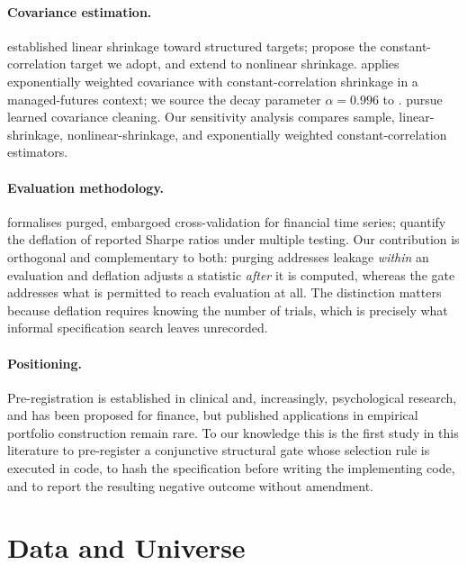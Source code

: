 \documentclass[12pt,letterpaper]{article}
\begin{document}
\paragraph{Covariance estimation.} \citet{ledoitwolf2004a} established linear
shrinkage toward structured targets; \citet{ledoitwolf2004b} propose the
constant-correlation target we adopt, and \citet{ledoitwolf2022} extend to nonlinear
shrinkage. \citet{molyboga2020} applies exponentially weighted covariance with
constant-correlation shrinkage in a managed-futures context; we source the decay
parameter $\alpha = 0.996$ to \citet{pafka2004}.
\citet{bongiorno2026} pursue learned covariance cleaning. Our sensitivity analysis
compares sample, linear-shrinkage, nonlinear-shrinkage, and exponentially weighted
constant-correlation estimators.

\paragraph{Evaluation methodology.} \citet{lopezdeprado2018} formalises purged,
embargoed cross-validation for financial time series; \citet{bailey2014} quantify the
deflation of reported Sharpe ratios under multiple testing. Our contribution is
orthogonal and complementary to both: purging addresses leakage \emph{within} an
evaluation and deflation adjusts a statistic \emph{after} it is computed, whereas the
gate addresses what is permitted to reach evaluation at all. The distinction matters
because deflation requires knowing the number of trials, which is precisely what
informal specification search leaves unrecorded.

\paragraph{Positioning.} Pre-registration is established in clinical and,
increasingly, psychological research, and has been proposed for finance, but
published applications in empirical portfolio construction remain rare. To our
knowledge this is the first study in this literature to pre-register a conjunctive
structural gate whose selection rule is executed in code, to hash the specification before writing the implementing code, and to report the resulting negative outcome
without amendment.

\section{Data and Universe}
\end{document}
